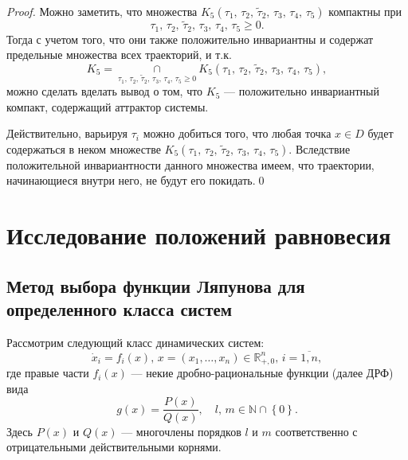 \documentclass[14pt,a4paper]{extarticle}
\begin{document}
\begin{proof}
		Можно заметить, что множества $K_5(\tau_1,\,\tau_2,\,\tilde{\tau}_2,\,\tau_3,\,\tau_4,\,\tau_5)$ компактны при
		\[\tau_1,\,\tau_2,\,\tilde{\tau}_2,\,\tau_3,\,\tau_4,\,\tau_5 \geqslant 0.\]
		Тогда с учетом того, что они также положительно инвариантны и содержат предельные множества всех траекторий, и т.к.
		\[K_5=\mathop{\cap}\limits_{\tau_1,\,\tau_2,\,\tilde{\tau}_2,\,\tau_3,\,\tau_4,\,\tau_5 \geqslant 0}K_5(\tau_1,\,\tau_2,\,\tilde{\tau}_2,\,\tau_3,\,\tau_4,\,\tau_5),\]
		можно сделать вделать вывод о том, что $K_5$ --- положительно инвариантный компакт, содержащий аттрактор системы.
		
		Действительно, варьируя $\tau_i$ можно добиться того, что любая точка $x\in D$ будет содержаться в неком множестве $K_5(\tau_1,\,\tau_2,\,\tilde{\tau}_2,\,\tau_3,\,\tau_4,\,\tau_5)$. Вследствие положительной инвариантности данного множества имеем, что траектории, начинающиеся внутри него, не будут его покидать.\qed
	\end{proof}	
	
	\section{Исследование положений равновесия}
	\subsection{Метод выбора функции Ляпунова для определенного класса систем}
	
	Рассмотрим следующий класс динамических систем:
	\[\dot{x}_i=f_i(x),\, x=(x_1,\dots,x_n)\in\mathbb{R}^{n}_{+,0},\, i=\overline{1,n},\]
	где правые части $f_i(x)$ --- некие дробно-рациональные функции (далее ДРФ) вида 
	\begin{equation*}
		g(x)=\dfrac{P(x)}{Q(x)},\quad l,\, m\in\mathbb{N}\cap\left\{0\right\}.
	\end{equation*}
	Здесь $P(x)$ и $Q(x)$ --- многочлены порядков $l$ и $m$ соответственно с отрицательными действительными корнями. 
	
\end{document}
